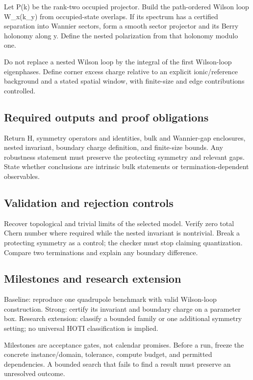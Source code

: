 \documentclass[
  11pt,
]{article}
\begin{document}
Let P(k) be the rank-two occupied projector. Build the path-ordered
Wilson loop W\_x(k\_y) from occupied-state overlaps. If its spectrum has
a certified separation into Wannier sectors, form a smooth sector
projector and its Berry holonomy along y. Define the nested polarization
from that holonomy modulo one.

Do not replace a nested Wilson loop by the integral of the first
Wilson-loop eigenphases. Define corner excess charge relative to an
explicit ionic/reference background and a stated spatial window, with
finite-size and edge contributions controlled.

\subsection{Required outputs and proof obligations}

Return H, symmetry operators and identities, bulk and Wannier-gap
enclosures, nested invariant, boundary charge definition, and
finite-size bounds. Any robustness statement must preserve the
protecting symmetry and relevant gaps. State whether conclusions are
intrinsic bulk statements or termination-dependent observables.

\subsection{Validation and rejection controls}

Recover topological and trivial limits of the selected model. Verify
zero total Chern number where required while the nested invariant is
nontrivial. Break a protecting symmetry as a control; the checker must
stop claiming quantization. Compare two terminations and explain any
boundary difference.

\subsection{Milestones and research extension}

Baseline: reproduce one quadrupole benchmark with valid Wilson-loop
construction. Strong: certify its invariant and boundary charge on a
parameter box. Research extension: classify a bounded family or one
additional symmetry setting; no universal HOTI classification is
implied.

Milestones are acceptance gates, not calendar promises. Before a run,
freeze the concrete instance/domain, tolerance, compute budget, and
permitted dependencies. A bounded search that fails to find a result
must preserve an unresolved outcome.
\end{document}
